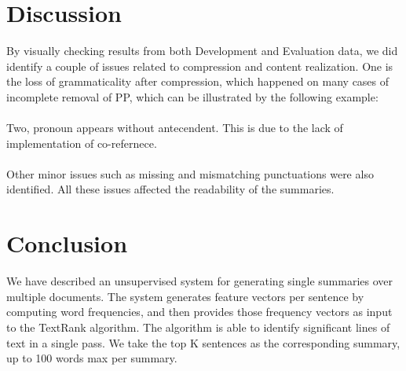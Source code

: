 \documentclass[11pt]{article}
\begin{document}
\section{Discussion}

By visually checking results from both Development and Evaluation data, we did identify a couple of issues related to compression and content realization. One is the loss of grammaticality after compression, which happened on many cases of incomplete removal of PP, which can be illustrated by the following example:
\\

\\ 

Two, pronoun appears without antecendent. This is due to the lack of implementation of co-refernece. 
\\

\\

Other minor issues such as missing and mismatching punctuations were also identified. All these issues affected the readability of the summaries.


\section{Conclusion}
 We have described an unsupervised system for generating single summaries over multiple documents. The system generates feature vectors per sentence by computing word frequencies, and then provides those frequency vectors as input to the TextRank algorithm. The algorithm is able to identify significant lines of text in a single pass. We take the top K sentences as the corresponding summary, up to 100 words max per summary.
\end{document}
